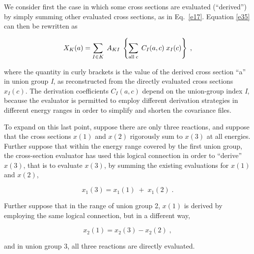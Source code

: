We consider first the case in which some cross sections are evaluated
(``derived'') by simply summing other evaluated cross sections, as in
Eq.~\ref{e17}.  Equation \ref{e35} can then be rewritten as

\begin{equation}
X_K(a) = \sum_{I\in K} \; A_{KI} \;\left\{\sum_{{\rm all\; c}} \;
  C_I(a,c)\;x_I(c)\right\} \;,
\end{equation}

\noindent
where the quantity in curly brackets is the value of the derived cross
section ``a'' in union group {\it I}, as reconstructed from the
directly evaluated cross sections $x_I (c)$.  The derivation
coefficients $C_I (a,c)$ depend on the union-group index {\it I},
because the evaluator is permitted to employ different derivation
strategies in different energy ranges in order to simplify and shorten
the covariance files.

To expand on this last point, suppose there are only three reactions,
and suppose that the cross sections $x(1)$ and $x(2)$ rigorously sum to
$x(3)$ at all energies.  Further suppose that within the
energy range {\rm cov}ered by the first union group, the cross-section
evaluator has used this logical connection in order to ``derive''
$x(3)$, that is to evaluate $x(3)$, by summing the existing evaluations
for $x(1)$ and $x(2)$,

\begin{equation}
x_1(3) = x_1(1)\;+\;x_1(2)\;.
\end{equation}

\noindent
Further suppose that in the range of union group 2, $x(1)$ is derived by
employing the same logical connection, but in a different way,

\begin{equation}
x_2(1) = x_2(3)-x_2(2)\;,
\end{equation}

\noindent
and in union group 3, all three reactions are directly evaluated.

